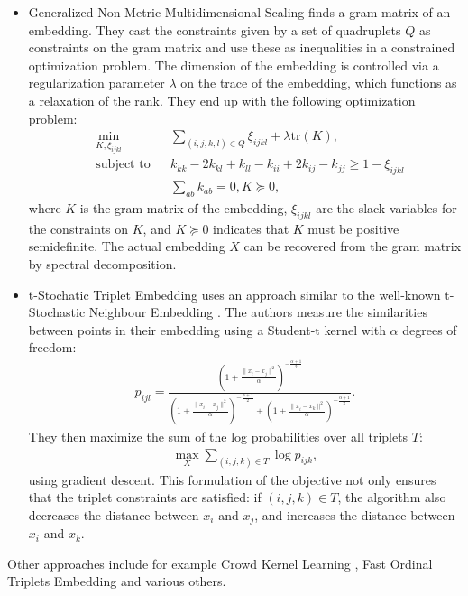 \begin{itemize}
    \item Generalized Non-Metric Multidimensional Scaling \citep[GNDMS,][]{agarwalGeneralizedNonmetricMultidimensional2007} finds a gram matrix of an embedding. 
        They cast the constraints given by a set of quadruplets $Q$ as constraints on the gram matrix 
        and use these as inequalities in a constrained optimization problem. The dimension
        of the embedding is controlled via a regularization parameter $\lambda$ on
        the trace of the embedding, which functions as a relaxation of the rank. 
        They end up with the following optimization problem:
        \begin{align*}
            &\min_{K, \xi_{ijkl}}          &       & \sum_{(i,j,k,l) \in Q} \xi_{ijkl} + \lambda 
            \text{tr}(K),\\
            &\text{subject to} &       & k_{kk} - 2k_{kl} + k_{ll} - k_{ii} + 2k_{ij} - k_{jj}
            \ge 1 - \xi_{ijkl}\\
            &                  &       & \sum_{ab} k_{ab} = 0, K \succeq 0,
        \end{align*}
        where $K$ is the gram matrix of the embedding, $\xi_{ijkl}$ are the slack variables
        for the constraints on $K$, and $K \succeq 0$ indicates that $K$ must be
        positive semidefinite. The actual embedding $X$ can be recovered from the gram matrix by
        spectral decomposition. 
    \item t-Stochatic Triplet Embedding \citep[t-STE,][]{laurensvandermaatenStochasticTripletEmbedding2012} uses an approach similar to the well-known t-Stochastic Neighbour Embedding 
        \citep[t-SNE,][]{maatenVisualizingDataUsing2008}. 
        The authors measure the similarities between points in their embedding using a Student-t kernel 
        with $\alpha$ degrees of freedom: 
        \begin{align*}
            p_{ijl} = \frac
            { \left( 1+ \frac{  \|x_i - x_j\|^2 }{\alpha}  \right)^{- \frac{\alpha + 1}{2}}  
            }
            { \left( 1+ \frac{  \|x_i - x_j\|^2 }{\alpha}  \right)^{- \frac{\alpha + 1}{2}} +
              \left( 1+ \frac{  \|x_i - x_k\|^2 }{\alpha}  \right)^{- \frac{\alpha + 1}{2}}  
            }
        .\end{align*}
        They then maximize the sum of the log probabilities over all triplets $T$:
        \begin{align*}
            \max_{X} \sum_{(i,j,k) \in T} \log p_{ijk},
        \end{align*}
        using gradient descent.
        This formulation of the objective not only ensures that the triplet constraints are satisfied: if $(i,j,k) \in T$, the algorithm 
        also decreases the distance between $x_i$ and $x_j$, and increases the distance
        between $x_i$ and $x_k$. 
\end{itemize}
Other approaches include for example 
Crowd Kernel Learning \citep[CKL,][]{tamuzAdaptivelyLearningCrowd2011}, Fast Ordinal Triplets Embedding \citep[FORTE,][]{jainFiniteSamplePrediction2016} and various others. 

